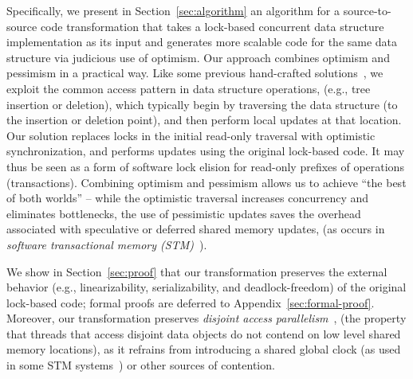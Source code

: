 Specifically, we present in Section~\ref{sec:algorithm} an algorithm for a source-to-source
code transformation that takes a lock-based concurrent data structure implementation as its input
and generates more scalable code for the same data structure via judicious use of optimism.
Our approach combines optimism and pessimism in a practical way.
Like some previous hand-crafted solutions~\cite{LazyList}, 
we exploit the common access pattern in data structure operations,
(e.g., tree insertion or deletion), which typically begin by traversing the data structure (to the insertion or deletion point), and then perform local updates at that location.
Our solution replaces locks in the initial read-only traversal with optimistic synchronization, and performs updates using the original lock-based code. It
may thus be seen as a form of software lock elision for read-only prefixes of operations (transactions).
%
Combining optimism and pessimism allows us to achieve ``the best of both worlds'' -- 
while the
optimistic traversal increases concurrency and eliminates bottlenecks,
the use of pessimistic updates saves the overhead associated with speculative or deferred shared
memory updates, (as occurs in \emph{software transactional memory (STM)}~\cite{HLR:SLCA2010}).
%


We show in Section~\ref{sec:proof} that our transformation preserves the external behavior (e.g., linearizability, serializability, and deadlock-freedom) of the original lock-based code; formal proofs are deferred to Appendix~\ref{sec:formal-proof}.
Moreover, our transformation preserves 
\emph{disjoint access parallelism}~\cite{Israeli:1994:DIS:197917.198079}, (the property that threads 
that access disjoint data objects do not contend on low level shared memory locations), as it
refrains from introducing a shared global clock (as used in some STM systems~\cite{DBLP:conf/eurosys/ShalevS06}) or other sources of contention. 


